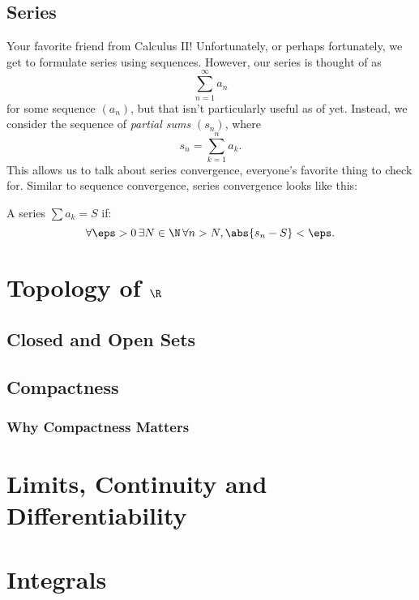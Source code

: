 \documentclass{article}
\begin{document}
\subsection*{Series}

Your favorite friend from Calculus II\@! Unfortunately, or perhaps fortunately, we get to formulate series using sequences.
However, our series is thought of as
\[ \sum_{n = 1}^{\infty}a_{n} \]
for some sequence $(a_{n})$, but that isn't particularly useful as of yet.
Instead, we consider the sequence of \emph{partial sums} $(s_{n})$, where
\[ s_{n} = \sum_{k = 1}^{n}a_{k}. \]
This allows us to talk about series convergence, everyone's favorite thing to check for. Similar to sequence convergence,
series convergence looks like this:
\begin{defn}
  A series $\sum a_{k} = S$ if:
  \[ \forall \eps > 0\, \exists N \in \N\, \forall n > N, \abs{s_{n} - S} < \eps.  \]
\end{defn}


\section*{Topology of $\R$}

\subsection*{Closed and Open Sets}

\subsection*{Compactness}

\subsubsection*{Why Compactness Matters}

\section*{Limits, Continuity and Differentiability}

\section*{Integrals}
\end{document}
